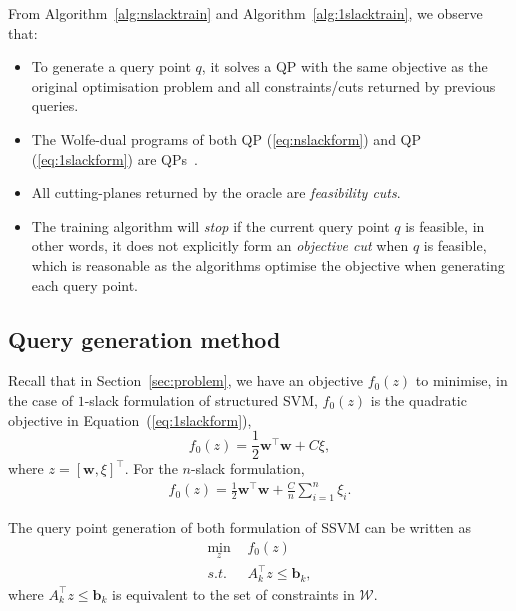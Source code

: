 From Algorithm~\ref{alg:nslacktrain} and Algorithm~\ref{alg:1slacktrain}, we observe that:
\begin{itemize}
\item To generate a query point $q$, it solves a QP with the same objective as the original optimisation problem and
      all constraints/cuts returned by previous queries. 
\item The Wolfe-dual programs of both QP (\ref{eq:nslackform}) and QP (\ref{eq:1slackform}) are QPs~\cite{tsochantaridis2005large,joachims2009cutting}.
\item All cutting-planes returned by the oracle are \emph{feasibility cuts}.
\item The training algorithm will \emph{stop} if the current query point $q$ is feasible, 
      in other words, it does not explicitly form an \emph{objective cut} when $q$ is feasible,
      which is reasonable as the algorithms optimise the objective when generating each query point.
\end{itemize}



\subsection{Query generation method}
\label{sec:ssvm_query}

Recall that in Section~\ref{sec:problem}, we have an objective $f_0(z)$ to minimise, in the case of $1$-slack formulation of structured SVM,
$f_0(z)$ is the quadratic objective in Equation~(\ref{eq:1slackform}), 
\begin{equation}
\label{eq:optobj}
f_0(z) = \frac{1}{2} \mathbf{w}^\top \mathbf{w} + C\xi,
\end{equation}
where $z = [\mathbf{w}, \xi]^\top$.
For the $n$-slack formulation, 
\begin{equation}
\begin{aligned}
f_0(z) = \frac{1}{2} \mathbf{w}^\top \mathbf{w} + \frac{C}{n} \sum_{i=1}^n \xi_i.
\end{aligned}
\end{equation}

The query point generation of both formulation of SSVM can be written as
\begin{equation*}
\begin{aligned}
\min_{z} ~& f_0(z) \\
s.t.~~ ~& A_k^\top z \le \mathbf{b}_k,
\end{aligned}
\end{equation*}
where $A_k^\top z \le \mathbf{b}_k$ is equivalent to the set of constraints in $\mathcal{W}$.



